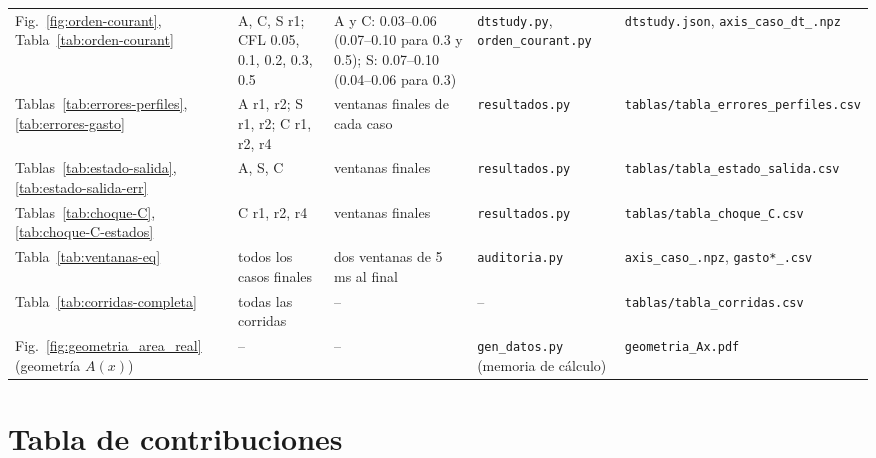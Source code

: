 \documentclass[12pt,letterpaper]{article}
\numberwithin{equation}{section}
\begin{document}
{\begin{longtable}{p{2.3cm}p{3.3cm}p{2.3cm}p{2.7cm}p{3.7cm}}
Fig.~\ref{fig:orden-courant}, Tabla~\ref{tab:orden-courant} & A, C, S r1; CFL 0.05, 0.1, 0.2, 0.3, 0.5 & A y C: 0.03--0.06 (0.07--0.10 para 0.3 y 0.5); S: 0.07--0.10 (0.04--0.06 para 0.3) & \texttt{dtstudy.py}, \texttt{orden\_\allowbreak courant.py} & \texttt{dtstudy.json}, \texttt{axis\_\allowbreak caso\_\allowbreak dt\_\allowbreak *.\allowbreak npz} \\
Tablas~\ref{tab:errores-perfiles}, \ref{tab:errores-gasto} & A r1, r2; S r1, r2; C r1, r2, r4 & ventanas finales de cada caso & \texttt{resultados.py} & \texttt{tablas/\allowbreak tabla\_\allowbreak errores\_\allowbreak perfiles.csv} \\
Tablas~\ref{tab:estado-salida}, \ref{tab:estado-salida-err} & A, S, C & ventanas finales & \texttt{resultados.py} & \texttt{tablas/\allowbreak tabla\_\allowbreak estado\_\allowbreak salida.csv} \\
Tablas~\ref{tab:choque-C}, \ref{tab:choque-C-estados} & C r1, r2, r4 & ventanas finales & \texttt{resultados.py} & \texttt{tablas/\allowbreak tabla\_\allowbreak choque\_\allowbreak C.csv} \\
Tabla~\ref{tab:ventanas-eq} & todos los casos finales & dos ventanas de 5 ms al final & \texttt{auditoria.py} & \texttt{axis\_\allowbreak caso\_\allowbreak *.\allowbreak npz}, \texttt{gasto*\_\allowbreak *.\allowbreak csv} \\
Tabla~\ref{tab:corridas-completa} & todas las corridas & -- & -- & \texttt{tablas/\allowbreak tabla\_\allowbreak corridas.csv} \\
Fig.~\ref{fig:geometria_area_real} (geometría $A(x)$) & -- & -- & \texttt{gen\_\allowbreak datos.py} (memoria de cálculo) & \texttt{geometria\_\allowbreak Ax.pdf} \\
\bottomrule
\end{longtable}
}

\section{Tabla de contribuciones}
\label{anexo:contribuciones}
\end{document}
